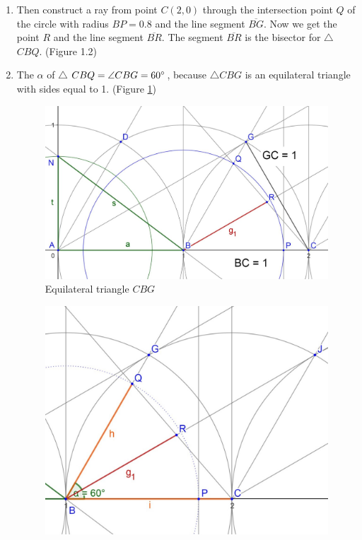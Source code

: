 \documentclass[12pt, letterpaper, oneside]{report}
\begin{document}
\begin{enumerate}
	\item Then construct a ray from point $C(2,0)$ through the intersection point $Q$ of the circle with radius $BP=0.8$ and the line segment $\overline{BG}$.
	\subitem Now we get the point $R$ and the line segment $\overline{BR}$. The segment $\overline{BR}$ is the bisector for $\triangle$ $CBQ$. (Figure 1.2)
	\item The \angle \textit{$\alpha$} of $\triangle$ $CBQ=\angle CBG=60\degree$, because $\triangle CBG$ is an equilateral triangle with sides equal to 1. (Figure \ref{fig:unit triangle})
\begin{figure}[H]
		\centerline{\includegraphics[scale=0.9]{images/cbg.jpg}}
		\caption{Equilateral triangle $CBG$}
		\label{fig:unit triangle}
\end{figure} 
\newpage
\begin{figure}[h]
	\centerline{\includegraphics[scale=0.9]{images/bisector0.jpg}}

\end{figure}
\end{enumerate}
\end{document}
